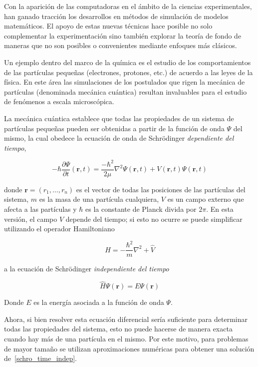 Con la aparici\'on de las computadoras en el \'ambito de la ciencias experimentales, han
ganado tracci\'on los desarrollos en m\'etodos de simulaci\'on de modelos matem\'aticos.
El apoyo de estas nuevas t\'ecnicas hace posible no solo
complementar la experimentaci\'on sino tambi\'en explorar la teor\'ia de fondo de maneras que
no son posibles o convenientes mediante enfoques m\'as cl\'asicos.

Un ejemplo dentro del marco de la qu\'imica es el estudio de los comportamientos de las
part\'iculas peque\~nas (electrones, protones, etc.) de acuerdo a las leyes de la f\'isica. En este \'area las
simulaciones de los postulados que rigen la mec\'anica de part\'iculas (denominada mec\'anica cu\'antica)
resultan invaluables para el estudio de fen\'omenos a escala microsc\'opica.

La mec\'anica cu\'antica establece que todas las propiedades de un sistema de part\'iculas peque\~nas
pueden ser obtenidas a partir de la funci\'on de onda $\Psi$ del mismo, la cual obedece la
ecuaci\'on de onda de Schr\"odinger \textit{dependiente del tiempo},

\begin{equation}
    \label{schro_time_dep}
    -\hbar\frac{\partial \Psi}{\partial t} (\mathbf{r},t) = \frac{-\hbar^2}{2\mu}\nabla^2 \Psi(\mathbf{r},t) + V(\mathbf{r},t) \Psi(\mathbf{r},t)
\end{equation}

donde $\mathbf{r} = (r_1,\dots,r_n)$ es el vector de todas las posiciones de las part\'iculas del sistema,
$m$ es la masa de una part\'icula cualquiera, $V$ es un campo externo que afecta a las part\'iculas y
$\hbar$ es la constante de Planck divida por $2\pi$. En esta versi\'on, el campo $V$ depende del tiempo; si
esto no ocurre se puede simplificar utilizando el operador Hamiltoniano

\begin{equation*}
    \hat{H} =  -\frac{\hbar^2}{m} \nabla^2 + \hat{V}
\end{equation*}

a la ecuaci\'on de Schr\"odinger \textit{independiente del tiempo}

\begin{equation}
    \label{schro_time_indep}
    \hat{H} \Psi(\mathbf{r}) = E \Psi(\mathbf{r})
\end{equation}

Donde $E$ es la energ\'ia asociada a la funci\'on de onda $\Psi$.

Ahora, si bien resolver esta ecuaci\'on diferencial ser\'ia suficiente para determinar todas las propiedades del sistema, esto no puede hacerse de
manera exacta cuando hay m\'as de una part\'icula en el mismo. Por este motivo, para problemas de mayor tama\~no se utilizan aproximaciones num\'ericas
para obtener una soluci\'on de~\ref{schro_time_indep}.

